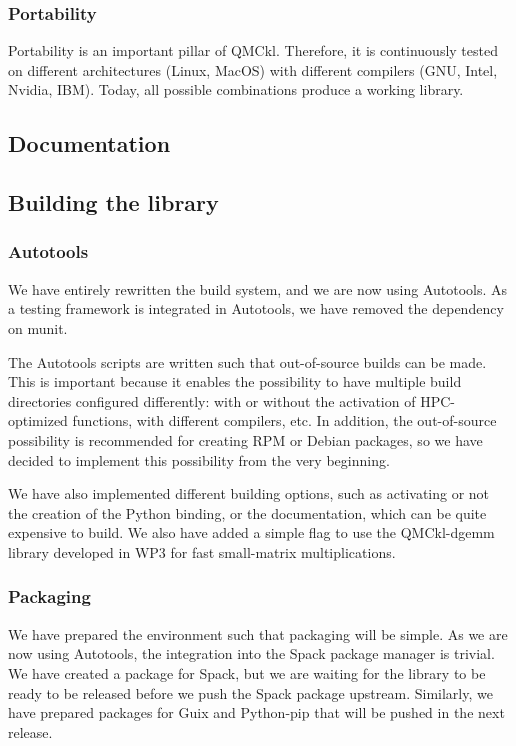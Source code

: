\subsubsection{Portability}

Portability is an important pillar of QMCkl. Therefore, it is
continuously tested on different architectures (Linux, MacOS) with
different compilers (GNU, Intel, Nvidia, IBM). Today, all possible
combinations produce a working library.


\subsection{Documentation}

\subsection{Building the library}

\subsubsection{Autotools}

We have entirely rewritten the build system, and we are now using
Autotools. As a testing framework is integrated in Autotools, we have
removed the dependency on munit.

The Autotools scripts are written such that out-of-source builds can
be made. This is important because it enables the possibility to have
multiple build directories configured differently: with or without the
activation of HPC-optimized functions, with different compilers, etc.
In addition, the out-of-source possibility is recommended for creating RPM
or Debian packages, so we have decided to implement this possibility
from the very beginning.

We have also implemented different building options, such as
activating or not the creation of the Python binding, or the
documentation, which can be quite expensive to build. We also have
added a simple flag to use the QMCkl-dgemm library developed in WP3 for
fast small-matrix multiplications.

\subsubsection{Packaging}

We have prepared the environment such that packaging will be
simple. As we are now using Autotools, the integration into the Spack
package manager is trivial. We have created a package for Spack, but
we are waiting for the library to be ready to be released before we
push the Spack package upstream.
Similarly, we have prepared packages for Guix and Python-pip that
will be pushed in the next release.

